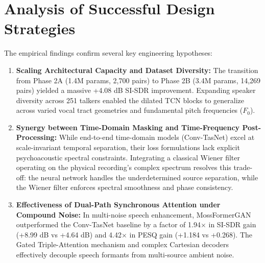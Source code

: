 \documentclass[11pt,a4paper]{report}
\begin{document}
\section{Analysis of Successful Design Strategies}
The empirical findings confirm several key engineering hypotheses:
\begin{enumerate}
    \item \textbf{Scaling Architectural Capacity and Dataset Diversity:} The transition from Phase 2A (1.4M params, 2,700 pairs) to Phase 2B (3.4M params, 14,269 pairs) yielded a massive +4.08 dB SI-SDR improvement. Expanding speaker diversity across 251 talkers enabled the dilated TCN blocks to generalize across varied vocal tract geometries and fundamental pitch frequencies ($F_0$).
    \item \textbf{Synergy between Time-Domain Masking and Time-Frequency Post-Processing:} While end-to-end time-domain models (Conv-TasNet) excel at scale-invariant temporal separation, their loss formulations lack explicit psychoacoustic spectral constraints. Integrating a classical Wiener filter operating on the physical recording's complex spectrum resolves this trade-off: the neural network handles the underdetermined source separation, while the Wiener filter enforces spectral smoothness and phase consistency.
    \item \textbf{Effectiveness of Dual-Path Synchronous Attention under Compound Noise:} In multi-noise speech enhancement, MossFormerGAN outperformed the Conv-TasNet baseline by a factor of 1.94$\times$ in SI-SDR gain (+8.99 dB vs +4.64 dB) and 4.42$\times$ in PESQ gain (+1.184 vs +0.268). The Gated Triple-Attention mechanism and complex Cartesian decoders effectively decouple speech formants from multi-source ambient noise.
\end{enumerate}
\end{document}
